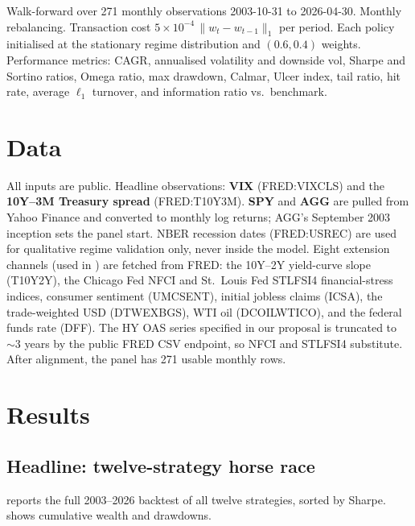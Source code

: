 \documentclass[11pt]{article}
\theoremstyle{plain1}
\theoremstyle{definition1}
\newcommand{\1}{\mathbf{1}}
\begin{document}
Walk-forward over 271 monthly observations 2003-10-31 to 2026-04-30. Monthly rebalancing. Transaction cost $5\times 10^{-4}\,\lVert w_t-w_{t-1}\rVert_1$ per period. Each policy initialised at the stationary regime distribution and $(0.6,0.4)$ weights. Performance metrics: CAGR, annualised volatility and downside vol, Sharpe and Sortino ratios, Omega ratio, max drawdown, Calmar, Ulcer index, tail ratio, hit rate, average $\ell_1$ turnover, and information ratio vs.\ benchmark.

\section{Data}\label{sec:data}

All inputs are public. Headline observations: \textbf{VIX} (FRED:VIXCLS) and the \textbf{10Y--3M Treasury spread} (FRED:T10Y3M). \textbf{SPY} and \textbf{AGG} are pulled from Yahoo Finance and converted to monthly log returns; AGG's September 2003 inception sets the panel start. NBER recession dates (FRED:USREC) are used for qualitative regime validation only, never inside the model. Eight extension channels (used in ) are fetched from FRED: the 10Y--2Y yield-curve slope (T10Y2Y), the Chicago Fed NFCI and St.\ Louis Fed STLFSI4 financial-stress indices, consumer sentiment (UMCSENT), initial jobless claims (ICSA), the trade-weighted USD (DTWEXBGS), WTI oil (DCOILWTICO), and the federal funds rate (DFF). The HY OAS series specified in our proposal is truncated to $\sim 3$ years by the public FRED CSV endpoint, so NFCI and STLFSI4 substitute. After alignment, the panel has 271 usable monthly rows.

\section{Results}\label{sec:results}

\subsection{Headline: twelve-strategy horse race}\label{sec:horserace}

 reports the full 2003--2026 backtest of all twelve strategies, sorted by Sharpe.  shows cumulative wealth and drawdowns.
\end{document}
